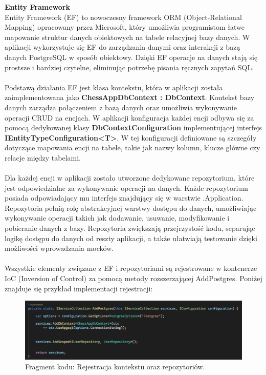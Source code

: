 \documentclass[12pt,a4paper]{article}
\begin{document}
\noindent \textbf{Entity Framework}\\
Entity Framework (EF) to nowoczesny framework ORM (Object-Relational Mapping) opracowany przez Microsoft, który umożliwia programistom łatwe mapowanie struktur danych obiektowych na tabele relacyjnej bazy danych. W aplikacji wykorzystuje się EF do zarządzania danymi oraz interakcji z bazą danych PostgreSQL w sposób obiektowy. Dzięki EF operacje na danych stają się prostsze i bardziej czytelne, eliminując potrzebę pisania ręcznych zapytań SQL.
\\\\
Podstawą działania EF jest klasa kontekstu, która w aplikacji została zaimplementowana jako \textbf{ChessAppDbContext : DbContext}. Kontekst bazy danych zarządza połączeniem z bazą danych oraz umożliwia wykonywanie operacji CRUD na encjach. W aplikacji konfiguracja każdej encji odbywa się za pomocą dedykowanej klasy \textbf{DbContextConfiguration } implementującej interfejs \textbf{IEntityTypeConfiguration<T>}. W tej konfiguracji definiowane są szczegóły dotyczące mapowania encji na tabele, takie jak nazwy kolumn, klucze główne czy relacje między tabelami.
\\\\
Dla każdej encji w aplikacji zostało utworzone dedykowane repozytorium, które jest odpowiedzialne za wykonywanie operacji na danych. Każde repozytorium posiada odpowiadający mu interfejs znajdujący się w warstwie .Application. Repozytoria pełnią rolę abstrakcyjnej warstwy dostępu do danych, umożliwiając wykonywanie operacji takich jak dodawanie, usuwanie, modyfikowanie i pobieranie danych z bazy. Repozytoria zwiększają przejrzystość kodu, separując logikę dostępu do danych od reszty aplikacji, a także ułatwiają testowanie dzięki możliwości wprowadzania mocków.
\\\\
Wszystkie elementy związane z EF i repozytoriami są rejestrowane w kontenerze IoC (Inversion of Control) za pomocą metody rozszerzającej AddPostgres. Poniżej znajduje się przykład implementacji rejestracji:

\vspace{0.5cm}
\begin{figure}[h!]
    \centering
    \includegraphics[width=1\textwidth]{images/ex_infra_extensions.png}
    \caption{Fragment kodu: Rejestracja kontekstu oraz repozytoriów.}
\end{figure}
\vspace{0.5cm}
\end{document}
